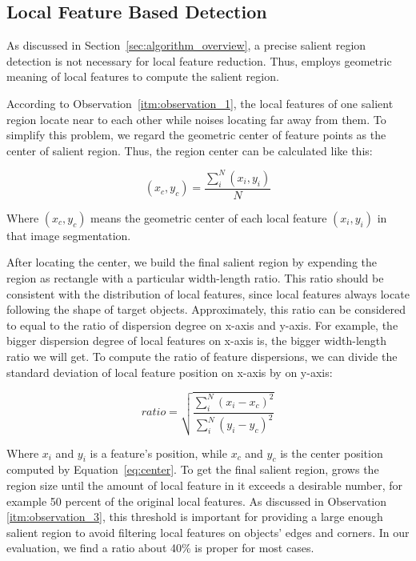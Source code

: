 \subsection{Local Feature Based Detection}
\label{sec:algorithm_detection}

As discussed in Section~\ref{sec:algorithm_overview}, a precise salient region detection is not necessary for local feature reduction. Thus, {\sys} employs geometric meaning of local features to compute the salient region.

According to Observation~\ref{itm:observation_1}, the local features of one salient region locate near to each other while noises locating far away from them. To simplify this problem, we regard the geometric center of feature points as the center of salient region. Thus, the region center can be calculated like this:

{\begin{equation} \label{eq:center}
\left({x}_{c},{y}_{c} \right) = \frac{\sum_{i}^{N}\left({x}_{i},{y}_{i} \right)}{N}
\end{equation}}

Where $\left({x}_{c},{y}_{c} \right)$ means the geometric center of each local feature $\left({x}_{i},{y}_{i} \right)$ in that image segmentation.

After locating the center, we build the final salient region by expending the region as rectangle with a particular width-length ratio. This ratio should be consistent with the distribution of local features, since local features always locate following the shape of target objects. Approximately, this ratio can be considered to equal to the ratio of dispersion degree on x-axis and y-axis. For example, the bigger dispersion degree of local features on x-axis is, the bigger width-length ratio we will get. To compute the ratio of feature dispersions, we can divide the standard deviation of local feature position on x-axis by on y-axis:

{\begin{equation} \label{eq:ratio}
ratio = \sqrt{\frac{\sum_{i}^{N}\left ( x_{i}-x_{c} \right )^{2}}{\sum_{i}^{N}\left ( y_{i}-y_{c} \right )^{2}}}
\end{equation}}

Where $x_{i}$ and $y_{i}$ is a feature's position, while $x_{c}$ and $y_{c}$ is the center position computed by Equation~\ref{eq:center}. To get the final salient region, {\sys} grows the region size until the amount of local feature in it exceeds a desirable number, for example 50 percent of the original local features. As discussed in Observation \ref{itm:observation_3}, this threshold is important for providing a large enough salient region to avoid filtering local features on objects' edges and corners. In our evaluation, we find a ratio about 40\% is proper for most cases.

